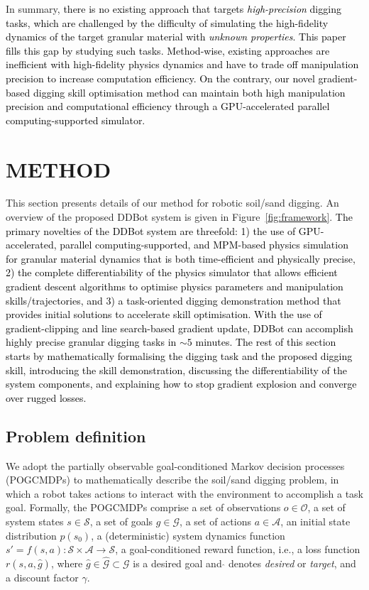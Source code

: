 \documentclass[letterpaper, 10 pt, journal, twoside]{ieeetran}
\newcommand{\rp}[1]{\textcolor{black}{#1}}
\begin{document}
In summary, \rp{there is no existing approach that targets \textit{high-precision} digging tasks, which are challenged by the difficulty of simulating the high-fidelity dynamics of the target granular material with \textit{unknown properties}. This paper fills this gap by studying such tasks. Method-wise, existing approaches are inefficient with high-fidelity physics dynamics and have to trade off manipulation precision to increase computation efficiency. On the contrary, our novel gradient-based digging skill optimisation method can maintain both high manipulation precision and computational efficiency through a GPU-accelerated parallel computing-supported simulator.}

\section{METHOD}\label{sec:method}
This section presents details of our method for robotic soil/sand digging. An overview of the proposed DDBot system is given in Figure~\ref{fig:framework}. \rp{The primary novelties of the DDBot system are threefold: 1) the use of GPU-accelerated, parallel computing-supported, and MPM-based physics simulation for granular material dynamics that is both time-efficient and physically precise, 2) the complete differentiability of the physics simulator that allows efficient gradient descent algorithms to optimise physics parameters and manipulation skills/trajectories, and 3) a task-oriented digging demonstration method that provides initial solutions to accelerate skill optimisation. With the use of gradient-clipping and line search-based gradient update, DDBot can accomplish highly precise granular digging tasks in $\sim5$ minutes. The rest of this section starts by mathematically formalising the digging task and the proposed digging skill, introducing the skill demonstration, discussing the differentiability of the system components, and explaining how to stop gradient explosion and converge over rugged losses.}

\subsection{Problem definition}\label{subsec:problem}
We adopt the partially observable goal-conditioned Markov decision processes (POGCMDPs) to mathematically describe the soil/sand digging problem, in which a robot takes actions to interact with the environment to accomplish a task goal. Formally, the POGCMDPs comprise a set of observations $o\in\mathcal{O}$, a set of system states $s\in\mathcal{S}$, a set of goals $g\in\mathcal{G}$, a set of actions $a\in\mathcal{A}$, an initial state distribution $p(s_0)$, a (deterministic) system dynamics function $s'=f(s, a): \mathcal{S}\times\mathcal{A}\rightarrow\mathcal{S}$, a goal-conditioned reward function, i.e., a loss function $r(s,a,\hat{g})$, where $\hat{g}\in\hat{\mathcal{G}}\subset\mathcal{G}$ is a desired goal and $\hat{}$ denotes \textit{desired} or \textit{target}, and a discount factor $\gamma$. 
\end{document}
